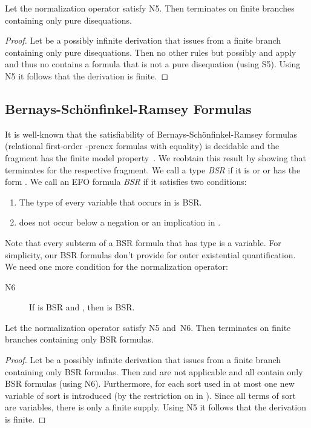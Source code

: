 \begin{prop}
  Let the normalization operator satisfy N5.  Then
   terminates on finite branches containing only
  pure disequations.
\end{prop}

\begin{proof}
  Let  be a possibly infinite
  derivation that issues from a finite branch
  containing only pure disequations.  Then no other
  rules but possibly \TRFDec and \TRFFE apply
  and thus no  contains a formula that is not
  a pure disequation (using S5).  Using N5
  it follows that the derivation is finite.
\end{proof}

\subsection{Bernays-Sch\"onfinkel-Ramsey Formulas}

It is well-known that the satisfiability of Bernays-Sch\"onfinkel-Ramsey
formulas (relational first-order -prenex
formulas with equality) is decidable and the fragment has the
finite model property~\cite{BGG97}.  We reobtain this
result by showing that  terminates for the
respective fragment.  We call a type \emph{BSR} if it
is  or  or has the form .
We call an EFO formula  \emph{BSR} if it satisfies
two conditions:
\begin{enumerate}
\item The type of every variable that occurs in  is
  BSR.
\item  does not occur below a negation or an implication in
  .
\end{enumerate}
Note that every subterm of a BSR formula that has type 
is a variable.
For simplicity, our BSR formulas don't provide for
outer existential quantification.  We need one more
condition for the normalization operator:
\begin{description}
\item[{N6}] If  is BSR and ,
  then  is BSR.
\end{description}

\begin{prop}
  Let the normalization operator satisfy N5 and~N6.
  Then  terminates on finite branches containing
  only BSR formulas.
\end{prop}

\begin{proof}
  Let  be a possibly infinite
  derivation that issues from a finite branch
  containing only BSR formulas.  Then \TRFalln and
  \TRFFE are not applicable and all  contain only
  BSR formulas (using N6).  Furthermore, for each sort 
  used in  at most one new
  variable of sort  is introduced (by the restriction on  in ).
  Since all terms of sort  are variables, there is only a finite supply.
  Using N5 it follows that the derivation is finite.
\end{proof}

